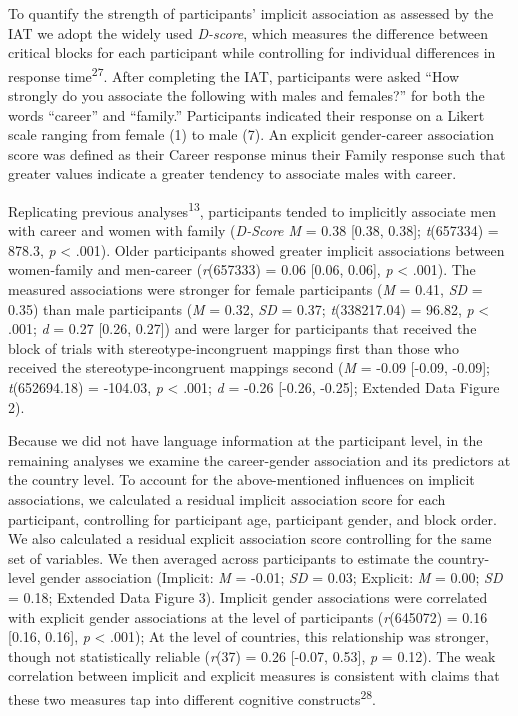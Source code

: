 \documentclass[11pt]{wlscirep}
\begin{document}
To quantify the strength of participants’ implicit association as assessed by the IAT we adopt the widely used  \emph{D-score}, which measures the difference between critical blocks for each participant while controlling for individual differences
in response time\textsuperscript{27}. After completing
the IAT, participants were asked \enquote{How strongly do you associate
the following with males and females?} for both the words
\enquote{career} and \enquote{family.} Participants indicated their
response on a Likert scale ranging from female (1) to male
(7). An explicit gender-career association score was defined as their Career response minus their Family response such that greater values indicate a greater tendency to associate males with career.

Replicating previous analyses\textsuperscript{13}, participants tended to implicitly associate men with career and women with family (\emph{D-Score M} = 0.38 {[}0.38, 0.38{]}; \emph{t}(657334) = 878.3, \emph{p} \textless{} .001). Older participants showed greater implicit associations between women-family and men-career  (\emph{r}(657333) = 0.06 {[}0.06, 0.06{]}, \emph{p} \textless{} .001).  The measured associations were stronger for female participants (\emph{M} = 0.41, \emph{SD} = 0.35) than male participants
(\emph{M} = 0.32, \emph{SD} = 0.37; \emph{t}(338217.04) = 96.82, \emph{p} \textless{} .001; \emph{d} = 0.27 {[}0.26, 0.27{]}) and were larger for participants that received the block of trials with stereotype-incongruent mappings first than those who received the stereotype-incongruent mappings second (\emph{M} = -0.09 {[}-0.09, -0.09{]}; \emph{t}(652694.18) = -104.03, \emph{p} \textless{} .001; \emph{d} = -0.26 {[}-0.26, -0.25{]}; Extended Data Figure 2).


Because we did not have language information at the participant level, in the remaining analyses we examine the career-gender association and its predictors at the country level. To account for the above-mentioned influences on implicit associations, we calculated a residual implicit association score for each participant, controlling for participant age, participant gender, and block order. We also calculated a residual explicit association score controlling for the same set of variables. We then averaged across participants to estimate the country-level gender association (Implicit: \emph{M} = -0.01; \emph{SD} = 0.03; Explicit: \emph{M} = 0.00; \emph{SD} = 0.18; Extended Data Figure 3). Implicit gender associations were correlated with explicit gender associations at the level of participants (\emph{r}(645072) = 0.16 {[}0.16, 0.16{]}, \emph{p} \textless{} .001); At the level of countries, this relationship was stronger, though not statistically reliable (\emph{r}(37) = 0.26 {[}-0.07, 0.53{]}, \emph{p} = 0.12). The weak correlation between implicit and explicit measures is consistent with claims that these two measures tap into different cognitive constructs\textsuperscript{28}.
\end{document}
